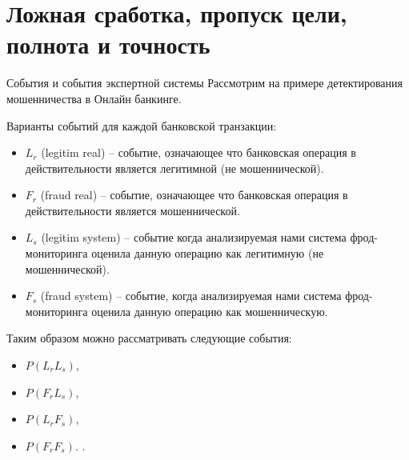 \section{Ложная сработка, пропуск цели, полнота и точность}


\begin{frame}{События и события экспертной системы}
\footnotesize
Рассмотрим на примере детектирования 
мошенничества в Онлайн банкинге.

Варианты событий для каждой банковской транзакции:
\begin{itemize}
	\item $L_r$ (legitim real) -- событие, означающее что банковская операция в действительности является легитимной (не мошеннической).
	\item $F_r$ (fraud real) -- событие, означающее что банковская операция в действительности является мошеннической. 
	\item $L_s$ (legitim system) -- событие когда анализируемая нами система фрод-мониторинга оценила данную операцию как легитимную (не мошеннической).
	\item $F_s$ (fraud system) -- событие, когда анализируемая нами система фрод-мониторинга оценила данную операцию как мошенническую.
\end{itemize}

\end{frame}

\begin{frame}

Таким образом можно рассматривать следующие события: 
\begin{itemize}
	\item $P(L_r L_s)$,
	\item $P(F_r L_s)$, 
	\item $P(L_r F_s)$,
	\item $P(F_r  F_s)$.
	.
\end{itemize}



\end{frame}

